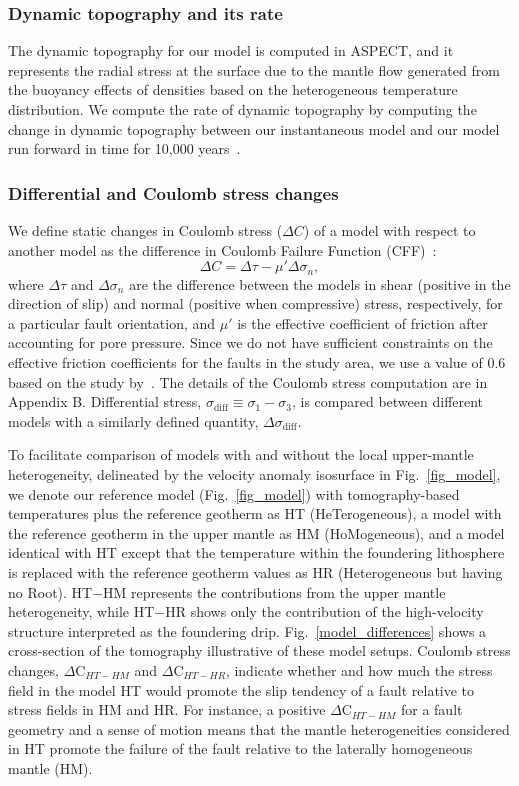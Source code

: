 \documentclass[draft,linenumbers]{agujournal2018}
\begin{document}
\subsubsection{Dynamic topography and its rate}
The dynamic topography for our model is computed in ASPECT, and it represents the radial stress at the surface due to the mantle flow generated from the buoyancy effects of densities based on the heterogeneous temperature distribution. We compute the rate of dynamic topography by computing the change in dynamic topography between our instantaneous model and our model run forward in time for 10,000 years~\citep{becker2015western}.  

\subsubsection{Differential and Coulomb stress changes}
We define static changes in Coulomb stress ($\Delta C$) of a model with respect to another model as the difference in Coulomb Failure Function (CFF)~\citep{king1994static}:
%
\begin{equation} \label{eq4}
    \Delta C = \Delta \tau - \mu' \Delta \sigma_n,
\end{equation}
%
where $\Delta \tau$ and $\Delta\sigma_n$ are the difference between the models in shear (positive in the direction of slip) and normal (positive when compressive) stress, respectively, for a particular fault orientation, and $\mu'$ is the effective coefficient of friction after accounting for pore pressure. Since we do not have sufficient constraints on the effective friction coefficients for the faults in the study area, we use a value of 0.6 based on the study by~\citet{hurd2012intraplate}. The details of the Coulomb stress computation are in Appendix B. Differential stress, $\sigma_{\text{diff}} \equiv \sigma_{1}-\sigma_{3}$, is compared between different models with a similarly defined quantity, $\Delta \sigma_{\text{diff}}$.


To facilitate comparison of models with and without the local upper-mantle heterogeneity, delineated by the velocity anomaly isosurface in Fig.~\ref{fig_model}, we denote our reference model (Fig.~\ref{fig_model}) with tomography-based temperatures plus the reference geotherm as HT (HeTerogeneous), a model with the reference geotherm in the upper mantle as HM (HoMogeneous), and a model identical with HT except that the temperature within the foundering lithosphere is replaced with the reference geotherm values as HR (Heterogeneous but having no Root). HT$-$HM represents the contributions from the upper mantle heterogeneity, while HT$-$HR shows only the contribution of the high-velocity structure interpreted as the foundering drip. Fig.~\ref{model_differences} shows a cross-section of the tomography illustrative of these model setups.  Coulomb stress changes, $\Delta$C$_{HT-HM}$ and $\Delta$C$_{HT-HR}$, indicate whether and how much the stress field in the model HT would promote the slip tendency of a fault relative to stress fields in HM and HR. For instance, a positive $\Delta$C$_{HT-HM}$ for a fault geometry and a sense of motion means that the mantle heterogeneities considered in HT promote the failure of the fault relative to the laterally homogeneous mantle (HM). 
\end{document}
